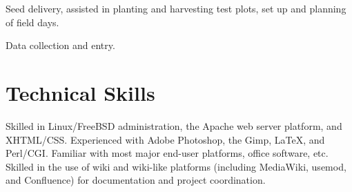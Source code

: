 \documentclass[letterpaper]{cv_brennen}
\begin{document}

\begin{compactitem}
\item Seed delivery, assisted in planting and harvesting test plots, set up and
      planning of field days. 
\item Data collection and entry.
\end{compactitem}

\section{Technical Skills}

\noindent Skilled in Linux/FreeBSD administration, the Apache web server
platform, and XHTML/CSS. Experienced with Adobe Photoshop, the Gimp, \LaTeX,
and Perl/CGI. Familiar with most major end-user platforms, office software, etc.
Skilled in the use of wiki and wiki-like platforms (including MediaWiki,
usemod, and Confluence) for documentation and project coordination.
\end{document}
